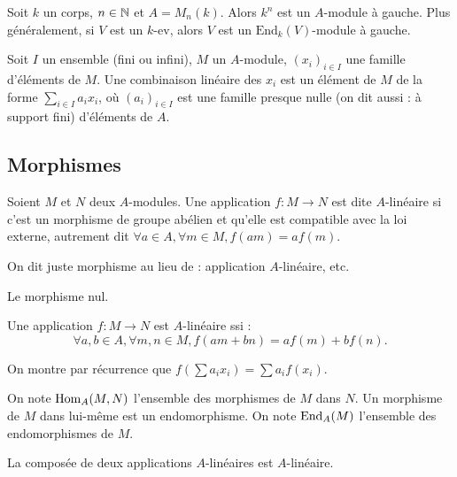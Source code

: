 \begin{exemple}
Soit $k$ un corps, $n \in \mathbb{N}$ et $A = M_n(k)$. Alors $k^n$ est un $A$-module à gauche. Plus généralement, si $V$ est un $k$-ev, alors $V$ est un $\mathrm{End}_k(V)$-module à gauche.
\end{exemple}



\begin{definition}
Soit $I$ un ensemble (fini ou infini), $M$ un $A$-module, $(x_i)_{i\in I}$ une famille  d'éléments de $M$. Une combinaison linéaire des $x_i$ est un élément de $M$ de la forme $\sum_{i\in I}a_ix_i$, où $(a_i)_{i\in I}$ est une famille presque nulle (on dit aussi : à support fini) d'éléments de $A$.\end{definition}

\subsection{Morphismes}

\begin{definition}[Morphisme] Soient $M$ et $N$ deux $A$-modules. Une application $f : M\to N$ est dite $A$-linéaire si c'est un morphisme de groupe abélien et qu'elle est compatible avec la loi externe, autrement dit $\forall a\in A, \forall m\in M, f(am)=af(m)$. 
\end{definition}

On dit juste morphisme au lieu de : application $A$-linéaire, etc.

\begin{exemple}
Le morphisme nul.
\end{exemple}

\begin{exo}
Une application $f : M\to N$ est $A$-linéaire ssi :
\[ \forall a, b \in A, \forall m, n \in M, f(am+bn)=af(m)+bf(n).\]
\end{exo}

On montre par récurrence que $f(\sum a_ix_i) = \sum a_if(x_i)$.

\begin{definition}
On note $\operatorname{Hom}_A(M,N)$ l'ensemble des morphismes de $M$ dans $N$. Un morphisme de $M$ dans lui-même est un endomorphisme. On note $\operatorname{End}_A(M)$ l'ensemble des endomorphismes de $M$.
\end{definition}



\begin{proposition} La composée de deux applications $A$-linéaires est $A$-linéaire.
\end{proposition}

